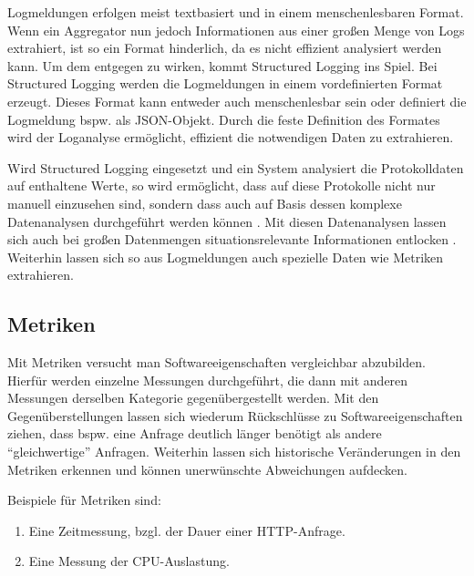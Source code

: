 
Logmeldungen erfolgen meist textbasiert und in einem menschenlesbaren Format. Wenn ein Aggregator nun jedoch Informationen aus einer großen Menge von Logs extrahiert, ist so ein Format hinderlich, da es nicht effizient analysiert werden kann. Um dem entgegen zu wirken, kommt Structured Logging ins Spiel. Bei Structured Logging \cite{StructuredAndInteroperableLogging} werden die Logmeldungen in einem vordefinierten Format erzeugt. Dieses Format kann entweder auch menschenlesbar sein oder definiert die Logmeldung bspw. als JSON-Objekt. Durch die feste Definition des Formates wird der Loganalyse ermöglicht, effizient die notwendigen Daten zu extrahieren.

Wird Structured Logging eingesetzt und ein System analysiert die Protokolldaten auf enthaltene Werte, so wird ermöglicht, dass auf diese Protokolle nicht nur manuell einzusehen sind, sondern dass auch auf Basis dessen komplexe Datenanalysen durchgeführt werden können \cite{StructuredAndInteroperableLogging}. Mit diesen Datenanalysen lassen sich auch bei großen Datenmengen situationsrelevante Informationen entlocken \cite{StructuredLoggingCraftingUsefulMessageContent}. Weiterhin lassen sich so aus Logmeldungen auch spezielle Daten wie Metriken extrahieren.

\subsection{Metriken}

Mit Metriken versucht man Softwareeigenschaften vergleichbar abzubilden. Hierfür werden einzelne Messungen durchgeführt, die dann mit anderen Messungen derselben Kategorie gegenübergestellt werden. Mit den Gegenüberstellungen lassen sich wiederum Rückschlüsse zu Softwareeigenschaften ziehen, dass bspw. eine Anfrage deutlich länger benötigt als andere \enquote{gleichwertige} Anfragen. Weiterhin lassen sich historische Veränderungen in den Metriken erkennen und können unerwünschte Abweichungen aufdecken.

Beispiele für Metriken sind:

\begin{enumerate}
	\item Eine Zeitmessung, bzgl. der Dauer einer HTTP-Anfrage.
	\item Eine Messung der CPU-Auslastung.
\end{enumerate}

